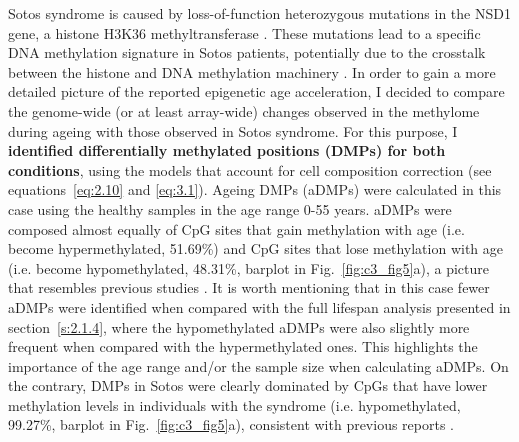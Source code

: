 Sotos syndrome is caused by loss-of-function heterozygous mutations in the NSD1 gene, a histone H3K36 methyltransferase \cite{Choufani2015, Kurotaki2002}. These mutations lead to a specific DNA methylation signature in Sotos patients, potentially due to the crosstalk between the histone and DNA methylation machinery \cite{Choufani2015}. In order to gain a more detailed picture of the reported epigenetic age acceleration, I decided to compare the genome-wide (or at least array-wide) changes observed in the methylome during ageing with those observed in Sotos syndrome. For this purpose, I \textbf{identified differentially methylated positions (DMPs) for both conditions}, using the models that account for cell composition correction (see equations~\ref{eq:2.10} and \ref{eq:3.1}). Ageing DMPs (aDMPs) were calculated in this case using the healthy samples in the age range 0-55 years. aDMPs were composed almost equally of CpG sites that gain methylation with age (i.e. become hypermethylated, 51.69\%) and CpG sites that lose methylation with age (i.e. become hypomethylated, 48.31\%, barplot in Fig.~\ref{fig:c3_fig5}a), a picture that resembles previous studies \cite{Zhu2018}. It is worth mentioning that in this case fewer aDMPs were identified when compared with the full lifespan analysis presented in section~\ref{s:2.1.4}, where the hypomethylated aDMPs were also slightly more frequent when compared with the hypermethylated ones. This highlights the importance of the age range and/or the sample size when calculating aDMPs. On the contrary, DMPs in Sotos were clearly dominated by CpGs that have lower methylation levels in individuals with the syndrome (i.e. hypomethylated, 99.27\%, barplot in Fig.~\ref{fig:c3_fig5}a), consistent with previous reports \cite{Choufani2015}.

